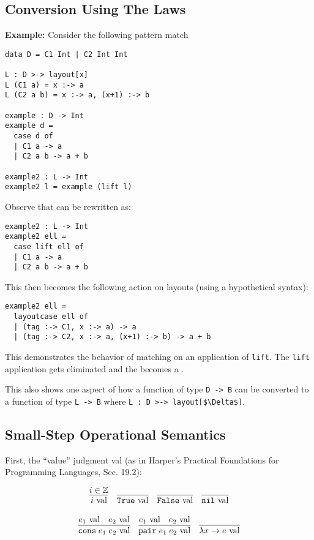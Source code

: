 \documentclass[10pt]{article}
\begin{document}
\subsection{Conversion Using The Laws}

\textbf{Example: }
Consider the following pattern match

\begin{lstlisting}
data D = C1 Int | C2 Int Int

L : D >-> layout[x]
L (C1 a) = x :-> a
L (C2 a b) = x :-> a, (x+1) :-> b

example : D -> Int
example d =
  case d of
  | C1 a -> a
  | C2 a b -> a + b

example2 : L -> Int
example2 l = example (lift l)
\end{lstlisting}

\noindent
Observe that  can be rewritten as:

\begin{lstlisting}
example2 : L -> Int
example2 ell =
  case lift ell of
  | C1 a -> a
  | C2 a b -> a + b
\end{lstlisting}

\noindent
This then becomes the following action on layouts (using a hypothetical syntax):

\begin{lstlisting}
example2 ell =
  layoutcase ell of 
  | (tag :-> C1, x :-> a) -> a
  | (tag :-> C2, x :-> a, (x+1) :-> b) -> a + b
\end{lstlisting}

\noindent
This demonstrates the behavior of  matching on an application of \lstinline{lift}. The \lstinline{lift} application
gets eliminated and the  becomes a .

This also shows one aspect of how a function of type \lstinline{D -> B} can be converted to a function of type
\lstinline{L -> B} where \lstinline{L : D >-> layout[$\Delta$]}.

\subsection{Small-Step Operational Semantics}

First, the ``value'' judgment val (as in Harper's Practical Foundations for Programming Languages, Sec. 19.2):

\[
  \begin{array}{cc}
    \infer{i \val}{i \in \mathbb{Z}}
    ~~~
    \infer{\True \val}{}
    ~~~
    \infer{\False \val}{}
    ~~~
    \infer{\nil \val}{}
    \\\\
    \infer{\cons\; e_1\; e_2 \val}{e_1 \val & e_2 \val}
    ~~~
    \infer{\pair\; e_1\; e_2 \val}{e_1 \val & e_2 \val}
    ~~~
    \infer{\lambda x \ra e \val}{}
  \end{array}
\]
\end{document}
